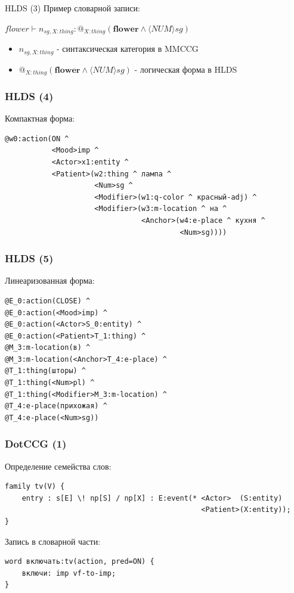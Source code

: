 \documentclass{beamer}
\begin{document}
\begin{frame}{HLDS (3)}
Пример словарной записи:\\
\bigskip
\begin{center}
$flower \vdash n_{sg,X:thing} : @_{X:thing}(\textbf{flower} \wedge \langle NUM \rangle sg)$
\end{center}
\bigskip
\begin{itemize}
	\item $n_{sg,X:thing}$ - синтаксическая категория в MMCCG
	\item $@_{X:thing}(\textbf{flower} \wedge \langle NUM \rangle sg)$ - логическая форма в HLDS
\end{itemize}	
\end{frame}


\begin{frame}[fragile]
\frametitle{HLDS (4)}
Компактная форма:
{\footnotesize \begin{verbatim}
@w0:action(ON ^
           <Mood>imp ^
           <Actor>x1:entity ^
           <Patient>(w2:thing ^ лампа ^
                     <Num>sg ^
                     <Modifier>(w1:q-color ^ красный-adj) ^
                     <Modifier>(w3:m-location ^ на ^
                                <Anchor>(w4:e-place ^ кухня ^
                                         <Num>sg))))
\end{verbatim}}
\end{frame}

\begin{frame}[fragile]
\frametitle{HLDS (5)}
Линеаризованная форма:
{\footnotesize \begin{verbatim}
@E_0:action(CLOSE) ^ 
@E_0:action(<Mood>imp) ^
@E_0:action(<Actor>S_0:entity) ^ 
@E_0:action(<Patient>T_1:thing) ^ 
@M_3:m-location(в) ^ 
@M_3:m-location(<Anchor>T_4:e-place) ^ 
@T_1:thing(шторы) ^ 
@T_1:thing(<Num>pl) ^ 
@T_1:thing(<Modifier>M_3:m-location) ^ 
@T_4:e-place(прихожая) ^ 
@T_4:e-place(<Num>sg))
\end{verbatim}}
\end{frame}

\begin{frame}[fragile]
\frametitle{DotCCG (1)}
Определение семейства слов:
{\footnotesize \begin{verbatim}
family tv(V) {
    entry : s[E] \! np[S] / np[X] : E:event(* <Actor>  (S:entity) 
                                              <Patient>(X:entity));
}
\end{verbatim}}
\bigskip
\bigskip
Запись в словарной части:
{\footnotesize \begin{verbatim}
word включать:tv(action, pred=ON) {
    включи: imp vf-to-imp;
}
\end{verbatim}}
\end{frame}
\end{document}
